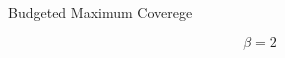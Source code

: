 \begin{frame}{Budgeted Maximum Coverege}
    \begin{center}
        $$
        \beta = 2
        $$
        
    \end{center}
\end{frame}